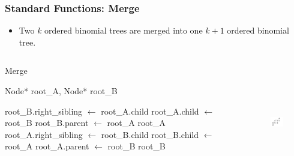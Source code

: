 \documentclass[13pt]{beamer}
\begin{document}
\begin{frame}
\frametitle{Standard Functions: Merge}
  \begin{itemize}
    \item Two $k$ ordered binomial trees are merged into one $k + 1$ ordered binomial tree.
  \end{itemize}

  \begin{columns}[T] %
    \begin{column}[T]{6cm} %
        \begin{algorithm}[H]
        \small
        \caption{Merge}
        \begin{algorithmic}
          \REQUIRE Node* root\_A, Node* root\_B

            \STATE root\_B.right\_sibling $\leftarrow$ root\_A.child
            \STATE root\_A.child $\leftarrow$ root\_B
            \STATE root\_B.parent $\leftarrow$ root\_A
            \RETURN root\_A
          \ELSE
            \STATE root\_A.right\_sibling $\leftarrow$ root\_B.child
            \STATE root\_B.child $\leftarrow$ root\_A
            \STATE root\_A.parent $\leftarrow$ root\_B
            \RETURN root\_B
          \ENDIF
        \end{algorithmic}
        \end{algorithm}
    \end{column}
    \begin{column}[T]{5.5cm} %
      \begin{figure}
        \includegraphics[height=5cm]{./img/postmerge.png}
      \end{figure}
    \end{column}
  \end{columns}

\end{frame}
\end{document}
